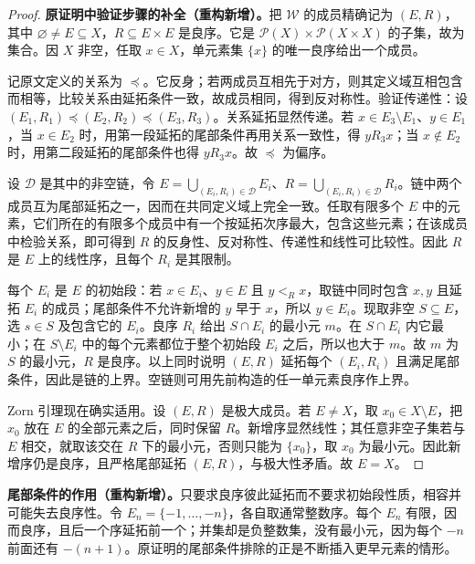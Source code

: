 \documentclass[../../main.tex]{subfiles}%
\begin{document}
\begin{proof}
\textbf{原证明中验证步骤的补全（重构新增）。}把 $\mathscr{W}$ 的成员精确记为 $(E,R)$，其中 $\varnothing\ne E\subseteq X$，$R\subseteq E\times E$ 是良序。它是 $\mathscr{P}(X)\times\mathscr{P}(X\times X)$ 的子集，故为集合。因 $X$ 非空，任取 $x\in X$，单元素集 $\{x\}$ 的唯一良序给出一个成员。

记原文定义的关系为 $\preccurlyeq$。它反身；若两成员互相先于对方，则其定义域互相包含而相等，比较关系由延拓条件一致，故成员相同，得到反对称性。验证传递性：设 $(E_1,R_1)\preccurlyeq(E_2,R_2)\preccurlyeq(E_3,R_3)$。关系延拓显然传递。若 $x\in E_3\setminus E_1$、$y\in E_1$，当 $x\in E_2$ 时，用第一段延拓的尾部条件再用关系一致性，得 $yR_3x$；当 $x\notin E_2$ 时，用第二段延拓的尾部条件也得 $yR_3x$。故 $\preccurlyeq$ 为偏序。

设 $\mathscr{D}$ 是其中的非空链，令 $E=\bigcup_{(E_i,R_i)\in\mathscr{D}}E_i$、$R=\bigcup_{(E_i,R_i)\in\mathscr{D}}R_i$。链中两个成员互为尾部延拓之一，因而在共同定义域上完全一致。任取有限多个 $E$ 中的元素，它们所在的有限多个成员中有一个按延拓次序最大，包含这些元素；在该成员中检验关系，即可得到 $R$ 的反身性、反对称性、传递性和线性可比较性。因此 $R$ 是 $E$ 上的线性序，且每个 $R_i$ 是其限制。

每个 $E_i$ 是 $E$ 的初始段：若 $x\in E_i$、$y\in E$ 且 $y<_R x$，取链中同时包含 $x,y$ 且延拓 $E_i$ 的成员；尾部条件不允许新增的 $y$ 早于 $x$，所以 $y\in E_i$。现取非空 $S\subseteq E$，选 $s\in S$ 及包含它的 $E_i$。良序 $R_i$ 给出 $S\cap E_i$ 的最小元 $m$。在 $S\cap E_i$ 内它最小；在 $S\setminus E_i$ 中的每个元素都位于整个初始段 $E_i$ 之后，所以也大于 $m$。故 $m$ 为 $S$ 的最小元，$R$ 是良序。以上同时说明 $(E,R)$ 延拓每个 $(E_i,R_i)$ 且满足尾部条件，因此是链的上界。空链则可用先前构造的任一单元素良序作上界。

Zorn 引理现在确实适用。设 $(E,R)$ 是极大成员。若 $E\ne X$，取 $x_0\in X\setminus E$，把 $x_0$ 放在 $E$ 的全部元素之后，同时保留 $R$。新增序显然线性；其任意非空子集若与 $E$ 相交，就取该交在 $R$ 下的最小元，否则只能为 $\{x_0\}$，取 $x_0$ 为最小元。因此新增序仍是良序，且严格尾部延拓 $(E,R)$，与极大性矛盾。故 $E=X$。
\end{proof}
\begin{remark}
\textbf{尾部条件的作用（重构新增）。}只要求良序彼此延拓而不要求初始段性质，相容并可能失去良序性。令 $E_n=\{-1,\ldots,-n\}$，各自取通常整数序。每个 $E_n$ 有限，因而良序，且后一个序延拓前一个；并集却是负整数集，没有最小元，因为每个 $-n$ 前面还有 $-(n+1)$。原证明的尾部条件排除的正是不断插入更早元素的情形。
\end{remark}
\end{document}
